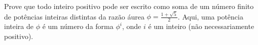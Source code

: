 Prove que todo inteiro positivo pode ser escrito como soma de um número finito de potências inteiras distintas da razão áurea $\phi=\frac{1+\sqrt{5}}{2}$. Aqui, uma potência inteira de $\phi$ é um número da forma $\phi^i$, onde $i$ é um inteiro (não necessariamente positivo).
